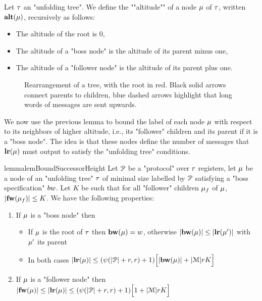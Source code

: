 \begin{definition}
	Let $\tau$ an "unfolding tree". We define the ""altitude"" of a node $\mu$ of $\tau$, written $\mathbf{alt}(\mu)$, recursively as follows:
	\begin{itemize}
		\item The altitude of the root is $0$,
		\item The altitude of a "boss node" is the altitude of its parent minus one,
		\item The altitude of a "follower node" is the altitude of its parent plus one.
	\end{itemize}
\end{definition}

\begin{figure}[h]
	
	\caption{Rearrangement of a tree, with the root in red. Black solid arrows connect parents to children, blue dashed arrows highlight that long words of messages are sent upwards.}
	\label{fig:rearrange-tree}
\end{figure}

We now use the previous lemma to bound the label of each node $\mu$ with respect to its neighbors of higher altitude, i.e., its "follower" children and its parent if it is a "boss node". The idea is that these nodes define the number of messages that $\mathbf{lr}(\mu)$ must output to satisfy the "unfolding tree" conditions.

\begin{restatable}{lemma}{lemBoundSuccessorHeight}
	\label{lem:bound-successor-height}
	Let $\mathcal{P}$ be a "protocol" over $r$ registers, let $\mu$ be a node of an "unfolding tree" $\tau$ of minimal size labelled by $\mathcal{P}$ satisfying a "boss specification" $\bossspec$.
	Let $K$ be such that for all "follower" children $\mu_f$ of $\mu$, $|\mathbf{fw}(\mu_f)| \leq K$.
	We have the following properties:
	
	\begin{enumerate}				
		\item  If $\mu$ is a "boss node" then 
		\begin{itemize}
			\item If $\mu$ is the root of $\tau$ then $\mathbf{bw}(\mu) = w$, otherwise $|\mathbf{bw}(\mu)| \leq |\mathbf{lr}(\mu')|$ with $\mu'$ its parent
			
			\item In both cases $|\mathbf{lr}(\mu)| \leq (\psi(|\mathcal{P}|+r,r) + 1)\Big[ |\mathbf{bw}(\mu)| + |\mathcal{M}|rK \Big]$
		\end{itemize}
		
		\item If $\mu$ is a "follower node" then  $|\mathbf{fw}(\mu)| \leq |\mathbf{lr}(\mu)| \leq (\psi(|\mathcal{P}|+r,r) +1)\Big[ 1 + |\mathcal{M}|rK \Big]$
			
	\end{enumerate}
\end{restatable}

